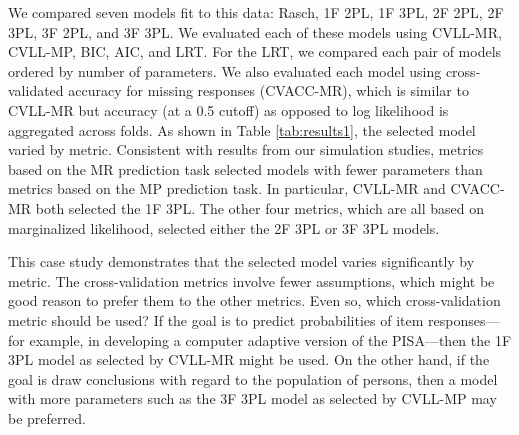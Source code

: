 \documentclass[
  english,
  man,floatsintext]{apa7}
\begin{document}
We compared seven models fit to this data: Rasch, 1F 2PL, 1F 3PL, 2F 2PL, 2F 3PL, 3F 2PL, and 3F 3PL. We evaluated each of these models using CVLL-MR, CVLL-MP, BIC, AIC, and LRT. For the LRT, we compared each pair of models ordered by number of parameters. We also evaluated each model using cross-validated accuracy for missing responses (CVACC-MR), which is similar to CVLL-MR but accuracy (at a 0.5 cutoff) as opposed to log likelihood is aggregated across folds. As shown in Table \ref{tab:results1}, the selected model varied by metric. Consistent with results from our simulation studies, metrics based on the MR prediction task selected models with fewer parameters than metrics based on the MP prediction task. In particular, CVLL-MR and CVACC-MR both selected the 1F 3PL. The other four metrics, which are all based on marginalized likelihood, selected either the 2F 3PL or 3F 3PL models.

This case study demonstrates that the selected model varies significantly by metric. The cross-validation metrics involve fewer assumptions, which might be good reason to prefer them to the other metrics. Even so, which cross-validation metric should be used? If the goal is to predict probabilities of item responses---for example, in developing a computer adaptive version of the PISA---then the 1F 3PL model as selected by CVLL-MR might be used. On the other hand, if the goal is draw conclusions with regard to the population of persons, then a model with more parameters such as the 3F 3PL model as selected by CVLL-MP may be preferred.
\end{document}
